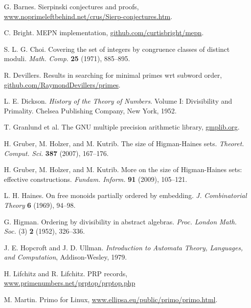 \documentclass[12pt]{article}
\theoremstyle{plain}
\theoremstyle{definition}
\newcommand{\0}{\mathtt{0}}
\newcommand{\1}{\mathtt{1}}
\newcommand{\2}{\mathtt{2}}
\newcommand{\3}{\mathtt{3}}
\newcommand{\4}{\mathtt{4}}
\newcommand{\5}{\mathtt{5}}
\newcommand{\6}{\mathtt{6}}
\newcommand{\7}{\mathtt{7}}
\newcommand{\8}{\mathtt{8}}
\newcommand{\9}{\mathtt{9}}
\newcommand{\updated}[1]{{\color{red}#1}}
\renewcommand{\updated}[1]{#1}
\begin{document}

\begin{thebibliography}{10}
\raggedright

  G. Barnes.
\newblock Sierpinski conjectures and proofs, \newline
\url{www.noprimeleftbehind.net/crus/Sierp-conjectures.htm}.

  C. Bright.
\newblock MEPN implementation,
\url{github.com/curtisbright/mepn}.

  S. L. G. Choi.
\newblock Covering the set of integers by congruence 
classes of distinct moduli.
\newblock \textit{Math. Comp.} {\bf 25} (1971), 885--895.

\updated{  R. Devillers.
\newblock Results in searching for minimal primes wrt subword order,
\url{github.com/RaymondDevillers/primes}.}

  L. E. Dickson.
\newblock \textit{History of the Theory of Numbers}.
\newblock Volume I:  Divisibility and Primality.
\newblock Chelsea Publishing Company, New York, 1952.

  T. Granlund et al.
\newblock The GNU multiple precision arithmetic library,
\url{gmplib.org}.

  H. Gruber, M. Holzer, and M. Kutrib.
\newblock The size of Higman-Haines sets.
\newblock \textit{Theoret. Comput. Sci.} {\bf 387} (2007), 167--176.

  H. Gruber, M. Holzer, and M. Kutrib.
\newblock More on the size of Higman-Haines sets:  effective constructions.
\newblock \textit{Fundam. Inform.} {\bf 91} (2009), 105--121.

  L. H. Haines.
\newblock On free monoids partially ordered by embedding.
\newblock \textit{J. Combinatorial Theory} {\bf 6} (1969), 94--98.

  G. Higman.
\newblock Ordering by divisibility in abstract algebras.
\newblock \textit{Proc. London Math. Soc.} (3) {\bf 2} (1952), 326--336.

  J. E. Hopcroft and J. D. Ullman.
\newblock \textit{Introduction to Automata Theory, Languages, and Computation},
Addison-Wesley, 1979.

\updated{  H. Lifchitz and R. Lifchitz.
\newblock PRP records,
\url{www.primenumbers.net/prptop/prptop.php}}

  M. Martin.
\newblock Primo for Linux,
\url{www.ellipsa.eu/public/primo/primo.html}.


\end{thebibliography}
\end{document}
